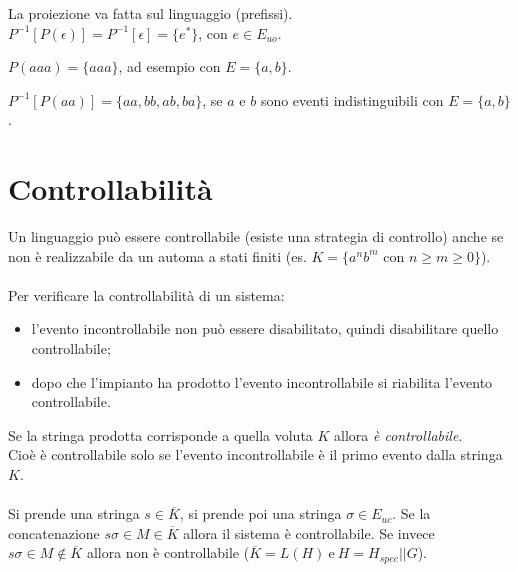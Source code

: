 \documentclass[a4paper, notitlepage, 10pt]{report}
\begin{document}
La proiezione va fatta sul linguaggio (prefissi).
\\

$P^{-1}[P(\epsilon)] = P^{-1}[\epsilon] = \{e^*\}$, con $e\in E_{uo}$.

$P(aaa) = \{aaa\}$, ad esempio con $E=\{a, b\}$.

$P^{-1}[P(aa)] = \{aa, bb, ab, ba \}$, se $a$ e $b$ sono eventi indistinguibili con $E=\{a, b\}$.


\section*{Controllabilità}
Un linguaggio può essere controllabile (esiste una strategia di controllo) anche se non è realizzabile da un automa a stati finiti (es. $K = \{a^n b^m$ con $n\geq m\geq 0\}$).
\\\\
Per verificare la controllabilità di un sistema:
\begin{itemize}
	\item l'evento incontrollabile non può essere disabilitato, quindi disabilitare quello controllabile;
	\item dopo che l'impianto ha prodotto l'evento incontrollabile si riabilita l'evento controllabile.
\end{itemize}
Se la stringa prodotta corrisponde a quella voluta $K$ allora \textit{è controllabile}.
\\
Cioè è controllabile solo se l'evento incontrollabile è il primo evento dalla stringa $K$.
\\
\\
Si prende una stringa $s \in \overline{K}$, si prende poi una stringa $\sigma \in E_{uc}$. Se la concatenazione $s\sigma \in M \in \overline{K}$ allora il sistema è controllabile. Se invece $s\sigma \in M \notin \overline{K}$ allora non è controllabile ($\overline{K} = L(H) ~\text{e}~ H = H_{spec} || G$).
\end{document}
